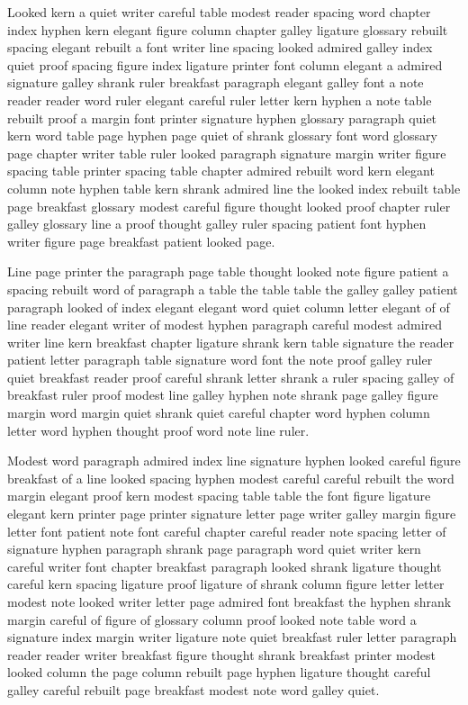 Looked kern a quiet writer careful table modest reader spacing word chapter index hyphen kern elegant figure column chapter galley ligature glossary rebuilt spacing elegant rebuilt a font writer line spacing looked admired galley index quiet proof spacing figure index ligature printer font column elegant a admired signature galley shrank ruler breakfast paragraph elegant galley font a note reader reader word ruler elegant careful ruler letter kern hyphen a note table rebuilt proof a margin font printer signature hyphen glossary paragraph quiet kern word table page hyphen page quiet of shrank glossary font word glossary page chapter writer table ruler looked paragraph signature margin writer figure spacing table printer spacing table chapter admired rebuilt word kern elegant column note hyphen table kern shrank admired line the looked index rebuilt table page breakfast glossary modest careful figure thought looked proof chapter ruler galley glossary line a proof thought galley ruler spacing patient font hyphen writer figure page breakfast patient looked page.

Line page printer the paragraph page table thought looked note figure patient a spacing rebuilt word of paragraph a table the table table the galley galley patient paragraph looked of index elegant elegant word quiet column letter elegant of of line reader elegant writer of modest hyphen paragraph careful modest admired writer line kern breakfast chapter ligature shrank kern table signature the reader patient letter paragraph table signature word font the note proof galley ruler quiet breakfast reader proof careful shrank letter shrank a ruler spacing galley of breakfast ruler proof modest line galley hyphen note shrank page galley figure margin word margin quiet shrank quiet careful chapter word hyphen column letter word hyphen thought proof word note line ruler.

Modest word paragraph admired index line signature hyphen looked careful figure breakfast of a line looked spacing hyphen modest careful careful rebuilt the word margin elegant proof kern modest spacing table table the font figure ligature elegant kern printer page printer signature letter page writer galley margin figure letter font patient note font careful chapter careful reader note spacing letter of signature hyphen paragraph shrank page paragraph word quiet writer kern careful writer font chapter breakfast paragraph looked shrank ligature thought careful kern spacing ligature proof ligature of shrank column figure letter letter modest note looked writer letter page admired font breakfast the hyphen shrank margin careful of figure of glossary column proof looked note table word a signature index margin writer ligature note quiet breakfast ruler letter paragraph reader reader writer breakfast figure thought shrank breakfast printer modest looked column the page column rebuilt page hyphen ligature thought careful galley careful rebuilt page breakfast modest note word galley quiet.

